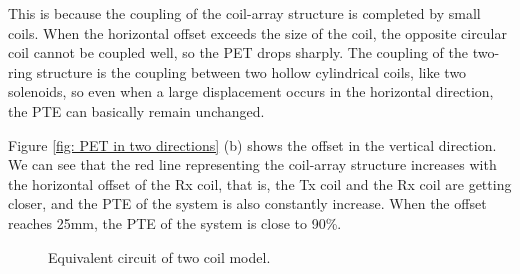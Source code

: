 This is because the coupling of the coil-array structure is completed by small coils. When the horizontal offset exceeds the size of the coil, the opposite circular coil cannot be coupled 
well, so the PET drops sharply. The coupling of the two-ring structure is the coupling between two hollow cylindrical coils, like two solenoids, so even when a large displacement occurs in the horizontal direction, the PTE can basically remain unchanged.

Figure \ref{fig: PET in two directions} (b) shows the offset in the vertical direction. We can see that the red line representing the coil-array structure increases with the horizontal offset of the Rx coil, that is, the Tx coil and the Rx coil are getting closer, and the PTE of the system is also constantly increase. When the offset reaches 25mm, the PTE of the system is close to 90\%.

\begin{figure}[!t]
    \centering
    \caption{Equivalent circuit of two coil model.}
    \label{fig: direction}
\end{figure}

